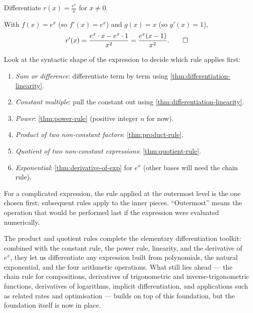 \begin{workedexample}
\begin{example}
Differentiate \(\displaystyle r(x) = \frac{e^{x}}{x}\) for \(x \neq 0\).
\end{example}

\begin{solution}
With \(f(x) = e^{x}\) (so \(f'(x) = e^{x}\)) and \(g(x) = x\) (so \(g'(x) = 1\)),
\[
r'(x) = \frac{e^{x} \cdot x - e^{x} \cdot 1}{x^{2}} = \frac{e^{x} (x - 1)}{x^{2}}. \qedhere
\]
\end{solution}
\end{workedexample}

\begin{strategy}
Look at the syntactic shape of the expression to decide which rule applies first:
\begin{enumerate}
    \item \emph{Sum or difference}: differentiate term by term using \cref{thm:differentiation-linearity}.
    \item \emph{Constant multiple}: pull the constant out using \cref{thm:differentiation-linearity}.
    \item \emph{Power}: \cref{thm:power-rule} (positive integer \(n\) for now).
    \item \emph{Product of two non-constant factors}: \cref{thm:product-rule}.
    \item \emph{Quotient of two non-constant expressions}: \cref{thm:quotient-rule}.
    \item \emph{Exponential}: \cref{thm:derivative-of-exp} for \(e^{x}\) (other bases will need the chain rule).
\end{enumerate}
For a complicated expression, the rule applied at the outermost level is the one chosen first; subsequent rules apply to the inner pieces. ``Outermost'' means the operation that would be performed last if the expression were evaluated numerically.
\end{strategy}

The product and quotient rules complete the elementary differentiation toolkit: combined with the constant rule, the power rule, linearity, and the derivative of \(e^{x}\), they let us differentiate any expression built from polynomials, the natural exponential, and the four arithmetic operations. What still lies ahead --- the chain rule for compositions, derivatives of trigonometric and inverse-trigonometric functions, derivatives of logarithms, implicit differentiation, and applications such as related rates and optimisation --- builds on top of this foundation, but the foundation itself is now in place.

